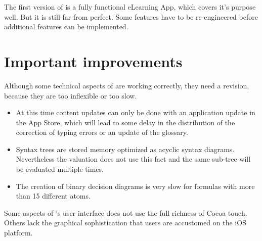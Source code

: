 
The first version of \Nyaya is a fully functional eLearning App, 
which covers it’s purpose well.
But it is still far from perfect.
Some features have to be re-engineered before additional features can be implemented.

\section{Important improvements}

Although some technical aspects of \Nyaya are working correctly, they need a revision, 
because they are too inflexible or too slow.

\begin{itemize}

\item At this time content updates can only be done with an application update in the App Store,
which will lead to some delay in the distribution of the correction of typing errors or an update of the glossary.

\item Syntax trees are stored memory optimized as acyclic syntax diagrams. 
Nevertheless the valuation does not use this fact and the same sub-tree will be evaluated multiple times.

\item The creation of binary decision diagrams is very slow for formulas with more than 15 different atoms.

\end{itemize}

Some aspects of \Nyaya’s user interface does not use the full richness of Cocoa touch. 
Others lack the graphical sophistication that users are accustomed on the iOS platform.

